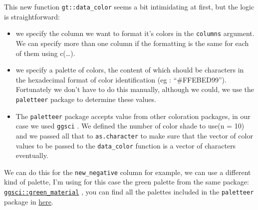 \documentclass[
]{article}
\begin{document}
This new function \texttt{gt::data\_color} seems a bit intimidating at
first, but the logic is straightforward:

\begin{itemize}
\item
  we specify the column we want to format it's colors in the
  \texttt{columns} argument. We can specify more than one column if the
  formatting is the same for each of them using c(\ldots).
\item
  we specify a palette of colors, the content of which should be
  characters in the hexadecimal format of color identification (eg :
  ``\#FFEBED99''). Fortunately we don't have to do this manually,
  although we could, we use the \texttt{paletteer} package to determine
  these values.
\item
  The \texttt{paletteer} package accepts value from other coloration
  packages, in our case we used \texttt{ggsci} . We defined the number
  of color shade to use(n = 10) and we passed all that to
  \texttt{as.character} to make sure that the vector of color values to
  be passed to the \texttt{data\_color} function is a vector of
  characters eventually.
\end{itemize}

We can do this for the \texttt{new\_negative} column for example, we can
use a different kind of palette, I'm using for this case the green
palette from the same package:
\href{https://github.com/nanxstats/ggsci}{\texttt{ggsci::green\_material}}
, you can find all the palettes included in the \texttt{paletteer}
package in
\href{https://emilhvitfeldt.github.io/paletteer/\#included-packages}{here}.
\end{document}
